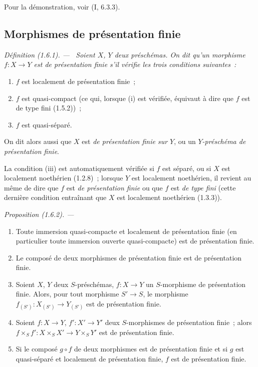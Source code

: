 \documentclass[10pt,oneside]{book}
\makeatletter
\newcommand{\setmanualcurrentlabel}[1]{\def\@currentlabel{#1}}
\newcommand{\oldpage}[2][]{%
  \setcounter{footnote}{0}%
  \marginpar{\scriptsize\textbf{#1}~|~#2}\ignorespaces}
\newenvironment{definition}[1][]{%
  \setmanualcurrentlabel{#1}\par\medskip\noindent\itshape Définition (#1). ---\ }{\par}
\newenvironment{proposition}[1][]{%
  \setmanualcurrentlabel{#1}\par\medskip\noindent\itshape Proposition (#1). ---\ }{\par}
\makeatother
\begin{document}
Pour la démonstration, voir (I, 6.3.3).

\subsection{Morphismes de présentation finie}
\label{subsection:IV.1.6-fr}

\begin{definition}[1.6.1]
\label{IV.1.6.1-fr}
Soient $X$, $Y$ deux préschémas. On dit qu'un morphisme $f:X\to Y$ est
\emph{de présentation finie} s'il vérifie les trois conditions suivantes~:
\begin{enumerate}
  \item[(i)] $f$ est localement de présentation finie~;
  \item[(ii)] $f$ est quasi-compact (ce qui, lorsque (i) est vérifiée,
  équivaut à dire que $f$ est de type fini (1.5.2))~;
  \item[(iii)] $f$ est quasi-séparé.
\end{enumerate}
On dit alors aussi que $X$ est \emph{de présentation finie sur $Y$}, ou un
\emph{$Y$-préschéma de présentation finie}.
\end{definition}

La condition (iii) est automatiquement vérifiée si $f$ est séparé, ou si $X$
est localement noethérien (1.2.8)~; lorsque $Y$ est localement noethérien, il
revient au même de dire que $f$ est \emph{de présentation finie} ou que $f$
est \emph{de type fini} (cette dernière condition entraînant que $X$ est
localement noethérien (1.3.3)).

\oldpage[IV-1]{235}

\begin{proposition}[1.6.2]
\label{IV.1.6.2-fr}
\begin{enumerate}
  \item[(i)] Toute immersion quasi-compacte et localement de présentation
  finie (en particulier toute immersion ouverte quasi-compacte) est de
  présentation finie.
  \item[(ii)] Le composé de deux morphismes de présentation finie est de
  présentation finie.
  \item[(iii)] Soient $X$, $Y$ deux $S$-préschémas, $f:X\to Y$ un
  $S$-morphisme de présentation finie. Alors, pour tout morphisme $S'\to S$,
  le morphisme $f_{(S')}:X_{(S')}\to Y_{(S')}$ est de présentation finie.
  \item[(iv)] Soient $f:X\to Y$, $f':X'\to Y'$ deux $S$-morphismes de
  présentation finie~; alors
  $f\times_Sf':X\times_SX'\to Y\times_SY'$ est de présentation finie.
  \item[(v)] Si le composé $g\circ f$ de deux morphismes est de présentation
  finie et si $g$ est quasi-séparé et localement de présentation finie, $f$
  est de présentation finie.
\end{enumerate}
\end{proposition}
\end{document}

